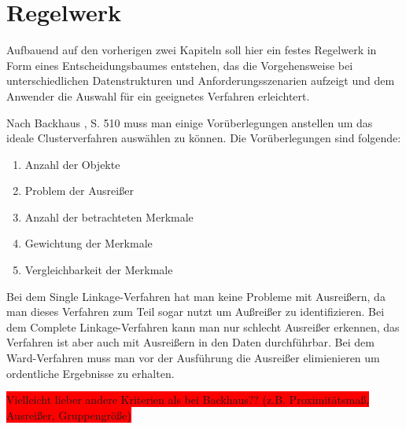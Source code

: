 \chapter{Regelwerk}

Aufbauend auf den vorherigen zwei Kapiteln soll hier ein festes Regelwerk in Form eines Entscheidungsbaumes entstehen, das die Vorgehensweise bei unterschiedlichen Datenstrukturen und Anforderungsszenarien aufzeigt und dem Anwender die Auswahl für ein geeignetes Verfahren erleichtert.

Nach Backhaus \cite{Backhaus.2016}, S. 510 muss man einige Vorüberlegungen anstellen um das ideale Clusterverfahren auswählen zu können. Die Vorüberlegungen sind folgende:
\begin{enumerate}
    \item Anzahl der Objekte
    \item Problem der Ausreißer
    \item Anzahl der betrachteten Merkmale
    \item Gewichtung der Merkmale
    \item Vergleichbarkeit der Merkmale
\end{enumerate}



Bei dem Single Linkage-Verfahren hat man keine Probleme mit Ausreißern, da man dieses Verfahren zum Teil sogar nutzt um Außreißer zu identifizieren. Bei dem Complete Linkage-Verfahren kann man nur schlecht Ausreißer erkennen, das Verfahren ist aber auch mit Ausreißern in den Daten durchführbar. Bei dem Ward-Verfahren muss man vor der Ausführung die Ausreißer elimienieren um ordentliche Ergebnisse zu erhalten.

\colorbox{red}{Vielleicht lieber andere Kriterien als bei Backhaus?? (z.B. Proximitätsmaß, Ausreißer, Gruppengröße)}
